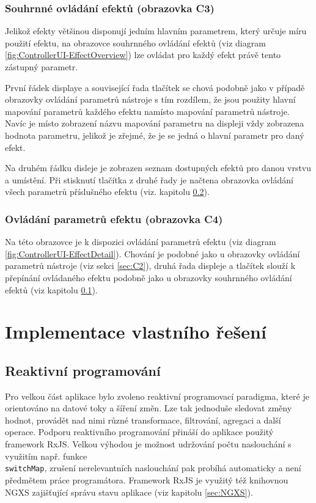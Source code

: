 \documentclass[thesis=M,czech]{FITthesis}[2019/03/06]
\begin{document}
		\subsection{Souhrnné ovládání efektů (obrazovka C3)}\label{sec:C3}
			Jelikož efekty většinou disponují jedním hlavním parametrem, který určuje míru použití efektu,
			na obrazovce souhrnného ovládání efektů (viz diagram \ref{fig:ControllerUI-EffectOverview}) lze ovládat pro každý
			efekt právě tento zástupný parametr.
			
			První řádek displaye a související řada tlačítek se chová podobně jako v případě obrazovky ovládání parametrů nástroje
			s tím rozdílem, že jsou použity hlavní mapování parametrů každého efektu namísto mapování parametrů nástroje.
			Navíc je místo zobrazení názvu mapování parametru na displeji vždy zobrazena hodnota parametru, jelikož je zřejmé,
			že je se jedná o hlavní parametr pro daný efekt.
			
			Na druhém řádku disleje je zobrazen seznam dostupných efektů pro danou vrstvu a umístění. Při stisknutí tlačítka
			z druhé řady je načtena obrazovka ovládání všech parametrů příslušného efektu (viz. kapitolu \ref{sec:C4}).
		
		\subsection{Ovládání parametrů efektu (obrazovka C4)}\label{sec:C4}
			Na této obrazovce je k dispozici ovládání parametrů efektu (viz diagram \ref{fig:ControllerUI-EffectDetail}).
			Chování je podobné jako u obrazovky ovládání parametrů nástroje (viz sekci \ref{sec:C2}), druhá řada displeje a tlačítek
			slouží k přepínání ovládaného efektu podobně jako u obrazovky souhrnného ovládání efektů (viz kapitolu \ref{sec:C3}).
		
\chapter{Implementace vlastního řešení}
	\section{Reaktivní programování}
		Pro velkou část aplikace bylo zvoleno reaktivní programovací paradigma, které je orientováno
		na datové toky a šíření změn. Lze tak jednoduše sledovat změny hodnot, provádět 
		nad nimi různé transformace, filtrování, agregaci a další operace. Podporu reaktivního programování přináší do aplikace
		použitý framework RxJS\cite{clow2018observers}. Velkou výhodou je možnost udržování počtu naslouchání
		s využitím např. funkce \\\texttt{switchMap}, zrušení nerelevantních naslouchání pak probíhá automaticky a není předmětem práce programátora.
		Framework RxJS je využitý též knihovnou NGXS zajišťující správu stavu aplikace (viz kapitolu \ref{sec:NGXS}).
\end{document}
